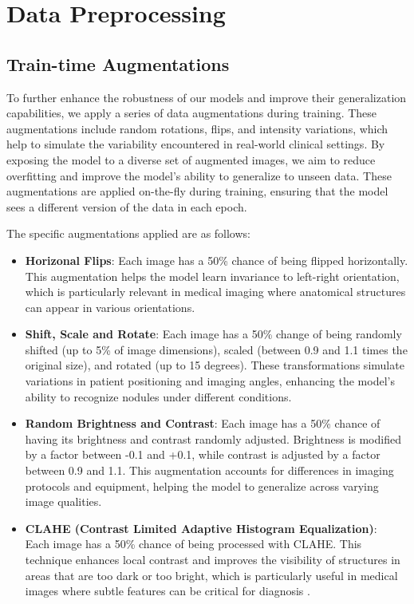 \section{Data Preprocessing}
\subsection{Train-time Augmentations}
\label{sec:augmentation}
To further enhance the robustness of our models and improve their generalization capabilities, we apply a series of data augmentations during training. These augmentations include random rotations, flips, and intensity variations, which help to simulate the variability encountered in real-world clinical settings. By exposing the model to a diverse set of augmented images, we aim to reduce overfitting and improve the model's ability to generalize to unseen data. These augmentations are applied on-the-fly during training, ensuring that the model sees a different version of the data in each epoch.

The specific augmentations applied are as follows:
\begin{itemize}
    \item \textbf{Horizonal Flips}: Each image has a 50\% chance of being flipped horizontally. This augmentation helps the model learn invariance to left-right orientation, which is particularly relevant in medical imaging where anatomical structures can appear in various orientations.
    \item \textbf{Shift, Scale and Rotate}: Each image has a 50\% change of being randomly shifted (up to 5\% of image dimensions), scaled (between 0.9 and 1.1 times the original size), and rotated (up to 15 degrees). These transformations simulate variations in patient positioning and imaging angles, enhancing the model's ability to recognize nodules under different conditions.
    \item \textbf{Random Brightness and Contrast}: Each image has a 50\% chance of having its brightness and contrast randomly adjusted. Brightness is modified by a factor between -0.1 and +0.1, while contrast is adjusted by a factor between 0.9 and 1.1. This augmentation accounts for differences in imaging protocols and equipment, helping the model to generalize across varying image qualities.
    \item \textbf{CLAHE (Contrast Limited Adaptive Histogram Equalization)}: \\Each image has a 50\% chance of being processed with CLAHE. This technique enhances local contrast and improves the visibility of structures in areas that are too dark or too bright, which is particularly useful in medical images where subtle features can be critical for diagnosis \cite{mishra2021clahe}.
\end{itemize}


